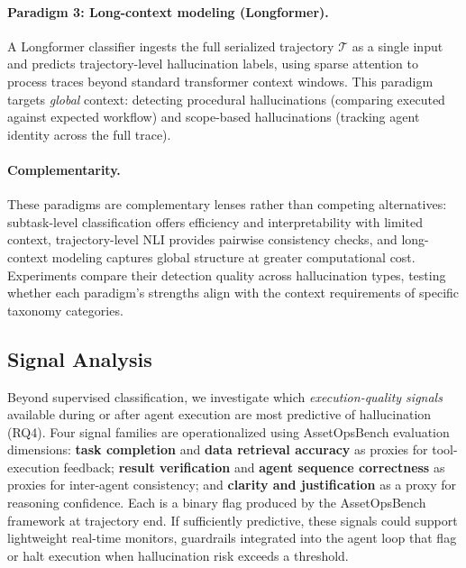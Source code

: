 \documentclass{article}
\begin{document}
\paragraph{Paradigm 3: Long-context modeling (Longformer).}
A Longformer classifier ingests the full serialized trajectory $\mathcal{T}$ as a single input and predicts trajectory-level hallucination labels, using sparse attention to process traces beyond standard transformer context windows. This paradigm targets \emph{global} context: detecting procedural hallucinations (comparing executed against expected workflow) and scope-based hallucinations (tracking agent identity across the full trace).

\paragraph{Complementarity.}
These paradigms are complementary lenses rather than competing alternatives: subtask-level classification offers efficiency and interpretability with limited context, trajectory-level NLI provides pairwise consistency checks, and long-context modeling captures global structure at greater computational cost. Experiments compare their detection quality across hallucination types, testing whether each paradigm's strengths align with the context requirements of specific taxonomy categories.

\subsection{Signal Analysis}
\label{sec:signals}

Beyond supervised classification, we investigate which \emph{execution-quality signals} available during or after agent execution are most predictive of hallucination (RQ4). Four signal families are operationalized using AssetOpsBench evaluation dimensions: \textbf{task completion} and \textbf{data retrieval accuracy} as proxies for tool-execution feedback; \textbf{result verification} and \textbf{agent sequence correctness} as proxies for inter-agent consistency; and \textbf{clarity and justification} as a proxy for reasoning confidence. Each is a binary flag produced by the AssetOpsBench framework at trajectory end. If sufficiently predictive, these signals could support lightweight real-time monitors, guardrails integrated into the agent loop that flag or halt execution when hallucination risk exceeds a threshold.

\end{document}
